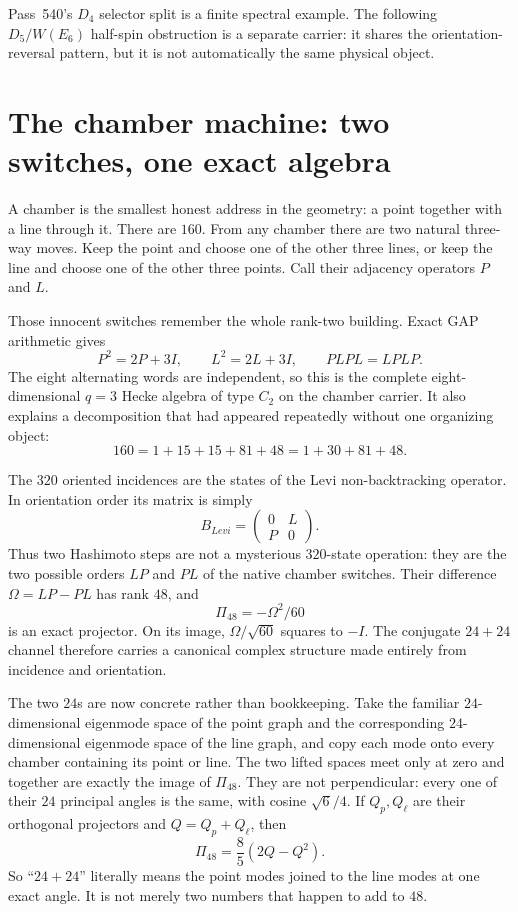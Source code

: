 \documentclass[11pt]{article}
\def\mathrm#1{#1}%
\begin{document}
Pass~540's $D_4$ selector split is a finite spectral example.  The following
$D_5/W(E_6)$ half-spin obstruction is a separate carrier: it shares the
orientation-reversal pattern, but it is not automatically the same physical
object.

\section{The chamber machine: two switches, one exact algebra}

A chamber is the smallest honest address in the geometry: a point together
with a line through it. There are $160$. From any chamber there are two natural
three-way moves. Keep the point and choose one of the other three lines, or keep
the line and choose one of the other three points. Call their adjacency
operators $P$ and $L$.

Those innocent switches remember the whole rank-two building. Exact GAP
arithmetic gives
\[
 P^2=2P+3I,\qquad L^2=2L+3I,\qquad PLPL=LPLP.
\]
The eight alternating words are independent, so this is the complete
eight-dimensional $q=3$ Hecke algebra of type $C_2$ on the chamber carrier.
It also explains a decomposition that had appeared repeatedly without one
organizing object:
\[
 160=1+15+15+81+48=1+30+81+48.
\]

The $320$ oriented incidences are the states of the Levi non-backtracking
operator. In orientation order its matrix is simply
\[
 B_{\mathrm{Levi}}=\begin{pmatrix}0&L\\P&0\end{pmatrix}.
\]
Thus two Hashimoto steps are not a mysterious $320$-state operation: they are
the two possible orders $LP$ and $PL$ of the native chamber switches. Their
difference $\Omega=LP-PL$ has rank $48$, and
\[
 \Pi_{48}=-\Omega^2/60
\]
is an exact projector. On its image, $\Omega/\sqrt{60}$ squares to $-I$.
The conjugate $24+24$ channel therefore carries a canonical complex structure
made entirely from incidence and orientation.

The two $24$s are now concrete rather than bookkeeping. Take the familiar
$24$-dimensional eigenmode space of the point graph and the corresponding
$24$-dimensional eigenmode space of the line graph, and copy each mode onto
every chamber containing its point or line. The two lifted spaces meet only at
zero and together are exactly the image of $\Pi_{48}$. They are not
perpendicular: every one of their $24$ principal angles is the same, with
cosine $\sqrt6/4$. If $Q_p,Q_\ell$ are their orthogonal projectors and
$Q=Q_p+Q_\ell$, then
\[
 \Pi_{48}=\frac85(2Q-Q^2).
\]
So ``$24+24$'' literally means the point modes joined to the line modes at one
exact angle. It is not merely two numbers that happen to add to $48$.
\end{document}
